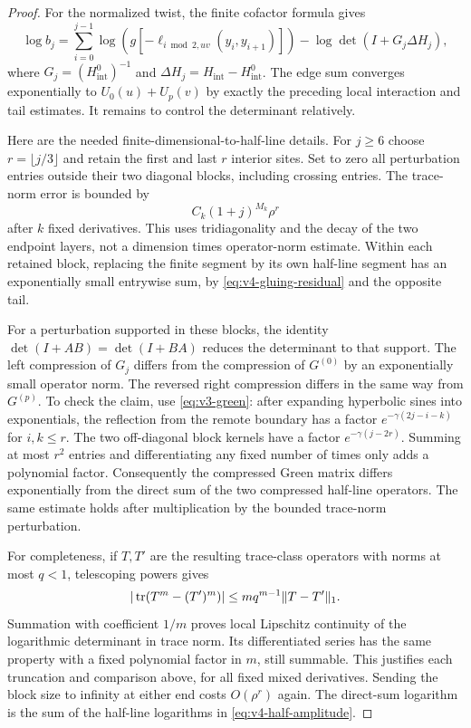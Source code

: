\begin{proof}
For the normalized twist, the finite cofactor formula gives
\begin{equation}\label{eq:v4-finite-log}
 \log b_j=
 \sum_{i=0}^{j-1}\log(g[-\ell_{i\bmod2,uv}(y_i,y_{i+1})])
 -\log\det(I+G_j\Delta H_j),
\end{equation}
where $G_j=(H^0_{\mathrm{int}})^{-1}$ and
$\Delta H_j=H_{\mathrm{int}}-H^0_{\mathrm{int}}$.
The edge sum converges exponentially to $U_0(u)+U_p(v)$ by exactly
the preceding local interaction and tail estimates. It remains to
control the determinant relatively.

Here are the needed finite-dimensional-to-half-line details. For
$j\ge6$ choose $r=\lfloor j/3\rfloor$ and retain the first and last
$r$ interior sites. Set to zero all perturbation entries outside their
two diagonal blocks, including crossing entries. The trace-norm error
is bounded by
\begin{equation}\label{eq:v4-det-tail}
 C_k(1+j)^{M_k}\rho^r
\end{equation}
after $k$ fixed derivatives. This uses tridiagonality and the decay of
the two endpoint layers, not a dimension times operator-norm estimate.
Within each retained block, replacing the finite segment by its own
half-line segment has an exponentially small entrywise sum, by
\eqref{eq:v4-gluing-residual} and the opposite tail.

For a perturbation supported in these blocks, the identity
$\det(I+AB)=\det(I+BA)$ reduces the determinant to that support.
The left compression of $G_j$ differs from the compression of
$G^{(0)}$ by an exponentially small operator norm. The reversed right
compression differs in the same way from $G^{(p)}$. To check the claim,
use \eqref{eq:v3-green}: after expanding hyperbolic sines into
exponentials, the reflection from the remote boundary has a factor
$e^{-\gamma(2j-i-k)}$ for $i,k\le r$. The two off-diagonal block
kernels have a factor $e^{-\gamma(j-2r)}$. Summing at most $r^2$
entries and differentiating any fixed number of times only adds a
polynomial factor. Consequently the compressed Green matrix differs
exponentially from the direct sum of the two compressed half-line
operators. The same estimate holds after multiplication by the bounded
trace-norm perturbation.

For completeness, if $T,T'$ are the resulting trace-class operators
with norms at most $q<1$, telescoping powers gives
\[
 |\operatorname{tr}(T^m-(T')^m)|\le m q^{m-1}\|T-T'\|_1.
\]
Summation with coefficient $1/m$ proves local Lipschitz continuity of
the logarithmic determinant in trace norm. Its differentiated series
has the same property with a fixed polynomial factor in $m$, still
summable. This justifies each truncation and comparison above, for all
fixed mixed derivatives. Sending the block size to infinity at either
end costs $O(\rho^r)$ again. The direct-sum logarithm is the sum of
the half-line logarithms in \eqref{eq:v4-half-amplitude}.


\end{proof}
